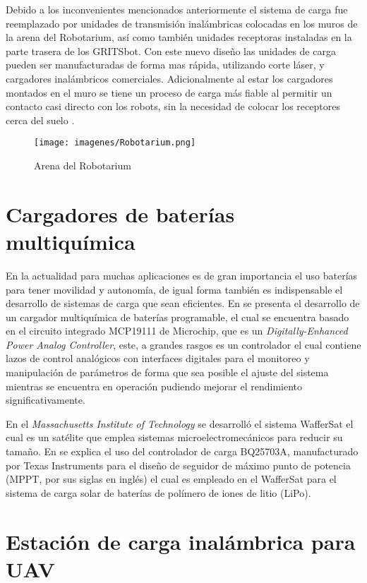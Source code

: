 Debido a los inconvenientes mencionados anteriormente el sistema de carga fue reemplazado por unidades de transmisión
inalámbricas colocadas en los muros de la arena del Robotarium, así como también unidades receptoras instaladas en la 
parte trasera de los GRITSbot. Con este nuevo diseño las unidades de carga pueden ser manufacturadas de forma
 mas rápida, utilizando corte láser, y cargadores inalámbricos comerciales. Adicionalmente al estar los cargadores
 montados en el muro se tiene un proceso de carga más fiable al permitir un contacto casi directo con los robots,
 sin la necesidad de colocar los receptores cerca del suelo \cite{wilson_robotarium_2021}. 

 \begin{figure}[H]
    \centering
    \texttt{[image: imagenes/Robotarium.png]}
    \caption{Arena del  Robotarium  \cite{wilson_robotarium_2021}}
    \label{fig:robotarium}
\end{figure}

\section{Cargadores de baterías multiquímica}
En la actualidad para muchas aplicaciones es de gran importancia el uso
baterías para tener movilidad y autonomía, de igual forma también es indispensable
el desarrollo de sistemas de carga que sean eficientes. En \cite{cleveland_developing_2015}
se presenta el desarrollo de un cargador multiquímica de baterías programable, el cual se 
encuentra basado en el circuito integrado MCP19111 de Microchip, que es un
\textit{Digitally-Enhanced Power Analog Controller}, este, a grandes rasgos es un controlador el cual
contiene lazos de control analógicos con interfaces digitales para el monitoreo y manipulación de parámetros
de forma que sea posible el ajuste del sistema mientras se encuentra en operación pudiendo mejorar el rendimiento
significativamente.  

En el \textit{Massachusetts Institute of Technology} se desarrolló el sistema WafferSat el cual  es un satélite que emplea 
sistemas microelectromecánicos para reducir su tamaño. En \cite{zapien_electrical_2020} se explica el uso del controlador de 
carga BQ25703A, manufacturado por Texas Instruments para el diseño de seguidor de máximo punto de potencia (MPPT, por
sus siglas en inglés) el cual es empleado en el WafferSat para el sistema de carga solar de baterías de polímero
 de iones de litio (LiPo).

\section{Estación de carga inalámbrica para UAV}

